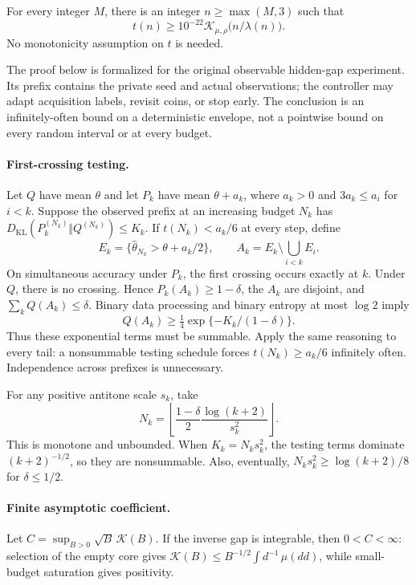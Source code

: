 \begin{theorem}
For every integer $M$, there is an integer $n\ge\max(M,3)$ such that
\[
 t(n)\ge10^{-22}\mathcal K_{\mu,\rho}\bigl(n/\lambda(n)\bigr).
 \tag{TU1}
\]
No monotonicity assumption on $t$ is needed.
\end{theorem}

The proof below is formalized for the original observable hidden-gap
experiment. Its prefix contains the private seed and actual observations;
the controller may adapt acquisition labels, revisit coins, or stop early.
The conclusion is an infinitely-often bound on a deterministic envelope,
not a pointwise bound on every random interval or at every budget.

\paragraph{First-crossing testing.}
Let $Q$ have mean $\theta$ and let $P_k$ have mean $\theta+a_k$, where
$a_k>0$ and $3a_k\le a_i$ for $i<k$. Suppose the observed prefix at an
increasing budget $N_k$ has
$D_{\mathrm{KL}}(P_k^{(N_k)}\Vert Q^{(N_k)})\le K_k$.
If $t(N_k)<a_k/6$ at every step, define
\[
 E_k=\{\widehat\theta_{N_k}>\theta+a_k/2\},\qquad
 A_k=E_k\setminus\bigcup_{i<k}E_i.
\]
On simultaneous accuracy under $P_k$, the first crossing occurs exactly
at $k$. Under $Q$, there is no crossing. Hence $P_k(A_k)\ge1-\delta$,
the $A_k$ are disjoint, and $\sum_k Q(A_k)\le\delta$.
Binary data processing and binary entropy at most $\log2$ imply
\[
 Q(A_k)\ge\tfrac14\exp\{-K_k/(1-\delta)\}.
 \tag{TU2}
\]
Thus these exponential terms must be summable. Apply the same reasoning
to every tail: a nonsummable testing schedule forces
$t(N_k)\ge a_k/6$ infinitely often. Independence across prefixes is
unnecessary.

For any positive antitone scale $s_k$, take
\[
 N_k=\left\lfloor\frac{1-\delta}{2}
                  \frac{\log(k+2)}{s_k^2}\right\rfloor.
 \tag{TU3}
\]
This is monotone and unbounded. When $K_k=N_ks_k^2$, the testing terms
dominate $(k+2)^{-1/2}$, so they are nonsummable. Also, eventually,
$N_ks_k^2\ge\log(k+2)/8$ for $\delta\le1/2$.

\paragraph{Finite asymptotic coefficient.}
Let $C=\sup_{B>0}\sqrt B\,\mathcal K(B)$. If the inverse gap is integrable,
then $0<C<\infty$: selection of the empty core gives
$\mathcal K(B)\le B^{-1/2}\int d^{-1}\,\mu(dd)$, while small-budget
saturation gives positivity.

